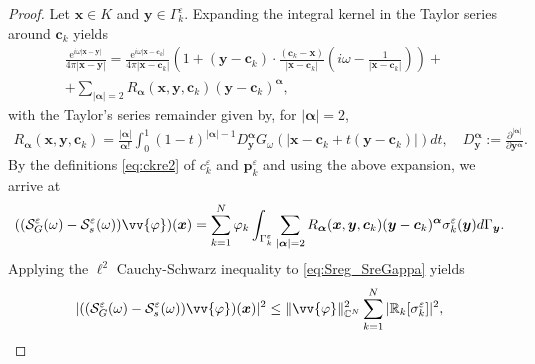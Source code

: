 \documentclass[]{article}
\numberwithin{equation}{section}
\numberwithin{theorem}{section}
\numberwithin{lemma}{section}
\numberwithin{corollary}{section}
\numberwithin{proposition}{section}
\numberwithin{definition}{section}
\newcommand{\bx}{\boldsymbol{x}}
\newcommand{\by}{\boldsymbol{y}}
\newcommand{\bc}{\boldsymbol{c}}
\newcommand{\re}{\varepsilon}
\renewcommand{\vec}{\boldsymbol}
\begin{document}
	\begin{proof}
		Let $\bx \in K$ and $\by \in \Gamma^{\re}_k$. Expanding the integral kernel in the Taylor series around $\vec{c}_k$ yields
		\begin{align*}%
			\frac{\mathrm{e}^{i\omega|\bx-\by|}}{4\pi|\bx-\by|} =\frac{\mathrm{e}^{i\omega|\bx-\vec{c}_k|}}{4\pi|\bx-\vec{c}_k|}\left(1+(\vec{y}-\vec{c}_k)\cdot \frac{(\vec{c}_k-\vec{x})}{|\vec{x}-\vec{c}_k|} \left(i\omega-\frac{1}{|\vec{x}-\vec{c}_k|}\right)\right)+&\\
			+\sum\limits_{|\vec{\alpha}|=2}R_{\vec{\alpha}}(\vec{x}, \vec{y}, \vec{c}_k)(\vec{y}-\vec{c}_k)^{\vec{\alpha}},&
		\end{align*}
		with the Taylor's series remainder given by, for $|\vec{\alpha}| = 2$, 
		\begin{align*}%
			R_{\vec{\alpha}}(\bx, \by, \bc_k) = \frac{|\vec{\alpha}|}{\vec{\alpha}!} \int_0^1(1-t)^{|\vec{\alpha}|-1} D^{\vec{\alpha}}_{\by} G_{\omega}(|\bx - \bc_k + t(\by-\bc_k)|) dt, \quad D^{\vec{\alpha}}_{\by} := \frac{\partial^{|\vec{\alpha}|}}{\partial \by^{\vec{\alpha}}}.
		\end{align*}
		By the definitions \eqref{eq:ckre2} of $c_k^{\re}$ and $\vec{p}_k^{\re}$ and using the above expansion, we arrive at
		\begin{align}
			\label{eq:Sreg_SreGappa}
			( ( \mathcal{S}^{\re}_G(\omega)-\mathcal{S}^{\re}_{s}(\omega)) \vv{\varphi} )(\vec{x})=\sum\limits_{k=1}^N \varphi_k\int_{\Gamma_k^{\re}}\sum_{|\vec{\alpha}|=2}R_{\vec{\alpha}}(\vec{x}, \vec{y}, \vec{c}_k)(\vec{y}-\vec{c}_k)^{\vec{\alpha}}\sigma_k^{\re}(\vec{y})d\Gamma_{\vec{y}}.
		\end{align}
		Applying the $\ell^2$ Cauchy-Schwarz inequality to \eqref{eq:Sreg_SreGappa} yields 
		\begin{align}
			\label{eq:Sreg_SreGappa_bound}
			| ( ( \mathcal{S}^{\re}_G(\omega)-\mathcal{S}^{\re}_{s}(\omega)) \vv{\varphi} )(\vec{x}) |^2 \leq \| \vv{\varphi} \|^2_{\mathbb{C}^N} \sum_{k=1}^N |\mathbb{R}_k[\sigma^{\re}_k]|^2,
		\end{align}

\end{proof}
\end{document}

